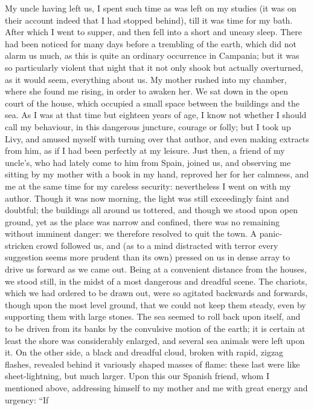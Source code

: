 My uncle having left us, I spent such time as was left on my studies (it
was on their account indeed that I had stopped behind), till it was time
for my bath. After which I went to supper, and then fell into a short and
uneasy sleep. There had been noticed for many days before a trembling of
the earth, which did not alarm us much, as this is quite an ordinary
occurrence in Campania; but it was so particularly violent that night that
it not only shook but actually overturned, as it would seem, everything
about us. My mother rushed into my chamber, where she found me rising, in
order to awaken her. We sat down in the open court of the house, which
occupied a small space between the buildings and the sea. As I was at that
time but eighteen years of age, I know not whether I should call my
behaviour, in this dangerous juncture, courage or folly; but I took up
Livy, and amused myself with turning over that author, and even making
extracts from him, as if I had been perfectly at my leisure. Just then, a
friend of my uncle's, who had lately come to him from Spain, joined us,
and observing me sitting by my mother with a book in my hand, reproved her
for her calmness, and me at the same time for my careless security:
nevertheless I went on with my author. Though it was now morning, the
light was still exceedingly faint and doubtful; the buildings all around
us tottered, and though we stood upon open ground, yet as the place was
narrow and confined, there was no remaining without imminent danger: we
therefore resolved to quit the town. A panic-stricken crowd followed us,
and (as to a mind distracted with terror every suggestion seems more
prudent than its own) pressed on us in dense array to drive us forward as
we came out. Being at a convenient distance from the houses, we stood
still, in the midst of a most dangerous and dreadful scene. The chariots,
which we had ordered to be drawn out, were so agitated backwards and
forwards, though upon the most level ground, that we could not keep them
steady, even by supporting them with large stones. The sea seemed to roll
back upon itself, and to be driven from its banks by the convulsive motion
of the earth; it is certain at least the shore was considerably enlarged,
and several sea animals were left upon it. On the other side, a black and
dreadful cloud, broken with rapid, zigzag flashes, revealed behind it
variously shaped masses of flame: these last were like sheet-lightning,
but much larger. Upon this our Spanish friend, whom I mentioned above,
addressing himself to my mother and me with great energy and urgency: ``If
